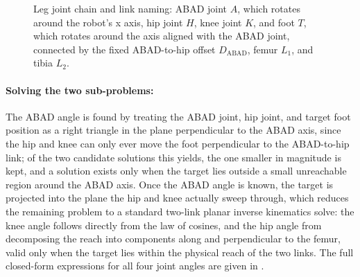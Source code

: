 \documentclass[12pt]{article}
\begin{document}
\begin{figure}[htbp]
    \centering
    \caption{Leg joint chain and link naming: ABAD joint $A$, which rotates around the robot's x axis, hip joint $H$, knee joint $K$, and foot $T$, which rotates around the axis aligned with the ABAD joint, connected by the fixed ABAD-to-hip offset $D_{\text{ABAD}}$, femur $L_1$, and tibia $L_2$.}
    \label{fig:leg_geometry}
\end{figure}

\paragraph{Solving the two sub-problems:} The ABAD angle is found by treating the ABAD joint, hip joint, and target foot position as a right triangle in the plane perpendicular to the ABAD axis, since the hip and knee can only ever move the foot perpendicular to the ABAD-to-hip link; of the two candidate solutions this yields, the one smaller in magnitude is kept, and a solution exists only when the target lies outside a small unreachable region around the ABAD axis. Once the ABAD angle is known, the target is projected into the plane the hip and knee actually sweep through, which reduces the remaining problem to a standard two-link planar inverse kinematics solve: the knee angle follows directly from the law of cosines, and the hip angle from decomposing the reach into components along and perpendicular to the femur, valid only when the target lies within the physical reach of the two links. The full closed-form expressions for all four joint angles are given in .
\end{document}
